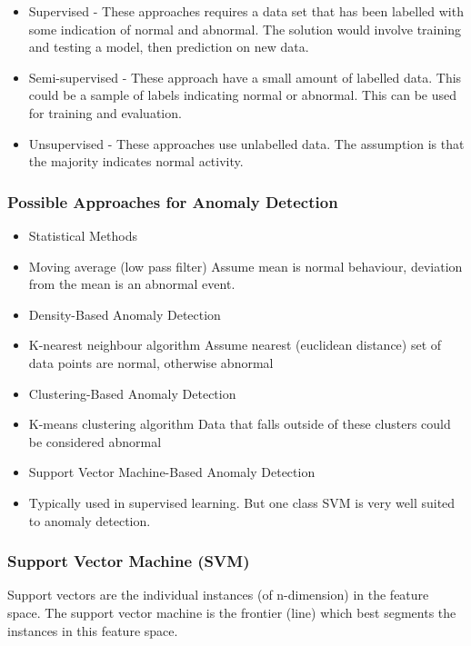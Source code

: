 \documentclass[11pt]{article}
\begin{document}
\begin{itemize}
\item
  Supervised - These approaches requires a data set that has been
  labelled with some indication of normal and abnormal. The solution
  would involve training and testing a model, then prediction on new
  data.
\item
  Semi-supervised - These approach have a small amount of labelled data.
  This could be a sample of labels indicating normal or abnormal. This
  can be used for training and evaluation.
\item
  Unsupervised - These approaches use unlabelled data. The assumption is
  that the majority indicates normal activity.
\end{itemize}

\subsubsection{Possible Approaches for Anomaly
Detection}\label{possible-approaches-for-anomaly-detection}

\begin{itemize}
\item
  Statistical Methods
\item
  Moving average (low pass filter) Assume mean is normal behaviour,
  deviation from the mean is an abnormal event.
\item
  Density-Based Anomaly Detection
\item
  K-nearest neighbour algorithm Assume nearest (euclidean distance) set
  of data points are normal, otherwise abnormal
\item
  Clustering-Based Anomaly Detection
\item
  K-means clustering algorithm Data that falls outside of these clusters
  could be considered abnormal
\item
  Support Vector Machine-Based Anomaly Detection
\item
  Typically used in supervised learning. But one class SVM is very well
  suited to anomaly detection.
\end{itemize}

\subsubsection{Support Vector Machine
(SVM)}\label{support-vector-machine-svm}

Support vectors are the individual instances (of n-dimension) in the
feature space. The support vector machine is the frontier (line) which
best segments the instances in this feature space.
\end{document}
